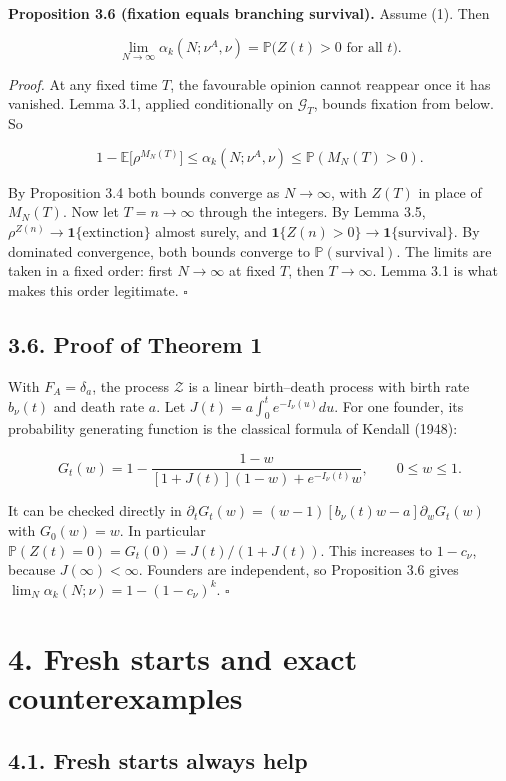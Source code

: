 \documentclass[
  british,
  11pt,
  a4paper,
]{article}
\begin{document}
\textbf{Proposition 3.6 (fixation equals branching survival).} Assume
(1). Then

\[
\lim_{N\to\infty}\alpha_k(N;\nu^A,\nu)=\mathbb P\bigl(Z(t)>0\text{ for all }t\bigr).
\]

\emph{Proof.} At any fixed time \(T\), the favourable opinion cannot
reappear once it has vanished. Lemma 3.1, applied conditionally on
\(\mathcal G_T\), bounds fixation from below. So

\[
1-\mathbb E\bigl[\rho^{M_N(T)}\bigr]\le\alpha_k(N;\nu^A,\nu)\le\mathbb P(M_N(T)>0).
\tag{20}
\]

By Proposition 3.4 both bounds converge as \(N\to\infty\), with \(Z(T)\)
in place of \(M_N(T)\). Now let \(T=n\to\infty\) through the integers.
By Lemma 3.5, \(\rho^{Z(n)}\to\mathbf 1\{\text{extinction}\}\) almost
surely, and \(\mathbf 1\{Z(n)>0\}\to\mathbf 1\{\text{survival}\}\). By
dominated convergence, both bounds converge to
\(\mathbb P(\text{survival})\). The limits are taken in a fixed order:
first \(N\to\infty\) at fixed \(T\), then \(T\to\infty\). Lemma 3.1 is
what makes this order legitimate. \(\square\)

\subsection{3.6. Proof of Theorem 1}\label{proof-of-theorem-1}

With \(F_A=\delta_a\), the process \(\mathcal Z\) is a linear
birth--death process with birth rate \(b_\nu(t)\) and death rate \(a\).
Let \(J(t)=a\int_0^te^{-I_\nu(u)}du\). For one founder, its probability
generating function is the classical formula of Kendall (1948):

\[
G_t(w)=1-\frac{1-w}{[1+J(t)](1-w)+e^{-I_\nu(t)}w},\qquad0\le w\le1.
\tag{21}
\]

It can be checked directly in
\(\partial_tG_t(w)=(w-1)[b_\nu(t)w-a]\partial_wG_t(w)\) with
\(G_0(w)=w\). In particular \(\mathbb P(Z(t)=0)=G_t(0)=J(t)/(1+J(t))\).
This increases to \(1-c_\nu\), because \(J(\infty)<\infty\). Founders
are independent, so Proposition 3.6 gives
\(\lim_N\alpha_k(N;\nu)=1-(1-c_\nu)^k\). \(\square\)

\section{4. Fresh starts and exact
counterexamples}\label{fresh-starts-and-exact-counterexamples}

\subsection{4.1. Fresh starts always
help}\label{fresh-starts-always-help}
\end{document}
